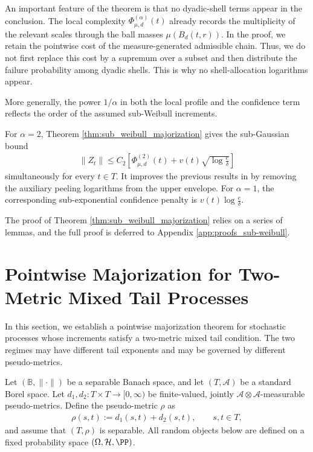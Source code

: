 \documentclass[11pt]{article}
\begin{document}
An important feature of the theorem is that no dyadic-shell terms appear in the conclusion. The
local complexity $\Phi_{\mu,d}^{(\alpha)}(t)$ already records the
multiplicity of the relevant scales through the ball masses
$\mu(B_d(t,r))$. In the proof, we retain the pointwise cost of the
measure-generated admissible chain. Thus, we do not first replace this
cost by a supremum over a subset and then distribute the failure
probability among dyadic shells. This is why no shell-allocation
logarithms appear.

More generally, the power $1/\alpha$ in both the local profile and the
confidence term reflects the order of the assumed sub-Weibull
increments.

For $\alpha=2$, Theorem \ref{thm:sub_weibull_majorization} gives the
sub-Gaussian bound
\begin{align*}
\|Z_t\|
\le
C_2
\left[
\Phi_{\mu,d}^{(2)}(t)
+
v(t)\sqrt{\log\frac{e}{\delta}}
\right]
\end{align*}
simultaneously for every $t\in T$. It improves the previous results in \citet{xu2026} by removing the auxiliary peeling logarithms from the upper envelope. For $\alpha=1$, the
corresponding sub-exponential confidence penalty is $v(t)\log\frac{e}{\delta}$.



The proof of Theorem \ref{thm:sub_weibull_majorization} relies on a series of lemmas, and the full proof is deferred to Appendix \ref{app:proofs_sub-weibull}.
\fi







\section{Pointwise Majorization for Two-Metric Mixed Tail Processes}\label{sec:mixed_tail-majorization}
In this section, we establish a pointwise majorization theorem for stochastic processes whose
increments satisfy a two-metric mixed tail condition. The two regimes may have
different tail exponents and may be governed by different pseudo-metrics.

Let $(\mathbb B,\|\cdot\|)$ be a separable Banach space, and let
$(T,\mathcal A)$ be a standard Borel space. Let
$d_1,d_2:T\times T\longrightarrow[0,\infty)$ be finite-valued, jointly
$\mathcal A\otimes\mathcal A$-measurable pseudo-metrics. Define the pseudo-metric $\rho$ as
\begin{align*}
\rho(s,t):=d_1(s,t)+d_2(s,t),
\qquad s,t\in T,
\end{align*}
and assume that $(T,\rho)$ is separable. All random objects below are
defined on a fixed probability space $(\Omega,\mathcal H,\PP)$.
\end{document}
